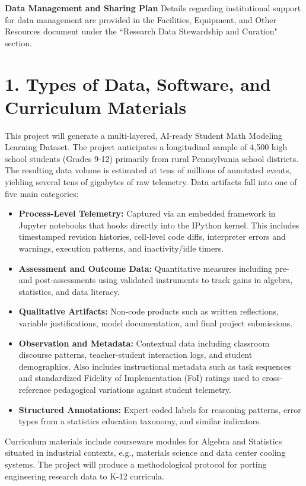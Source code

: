 \documentclass[11pt]{article}
\begin{document}
%

\noindent \textbf{Data Management and Sharing Plan} 
Details regarding institutional support for data management are provided in the Facilities, Equipment, and Other Resources document under the ``Research Data Stewardship and Curation" section.

\section*{1. Types of Data, Software, and Curriculum Materials}
This project will generate a multi-layered, AI-ready Student Math Modeling Learning Dataset.
The project anticipates a longitudinal sample of 4,500 high school students (Grades 9-12) primarily from rural Pennsylvania school districts.
The resulting data volume is estimated at tens of millions of annotated events, yielding several tens of gigabytes of raw telemetry. 
Data artifacts fall into one of five main categories:
\vspace{-0.15cm}
\begin{itemize}
    \item \textbf{Process-Level Telemetry:} Captured via an embedded framework in Jupyter notebooks that hooks directly into the IPython kernel. This includes timestamped revision histories, cell-level code diffs, interpreter errors and warnings, execution patterns, and inactivity/idle timers.\vspace{-0.3cm}
    \item \textbf{Assessment and Outcome Data:} Quantitative measures including pre- and post-assessments using validated instruments to track gains in algebra, statistics, and data literacy. \vspace{-0.3cm}
    \item \textbf{Qualitative Artifacts:} Non-code products such as written reflections, variable justifications, model documentation, and final project submissions.\vspace{-0.3cm}
    \item \textbf{Observation and Metadata:} Contextual data including classroom discourse patterns, teacher-student interaction logs, and student demographics. Also includes instructional metadata such as task sequences and standardized Fidelity of Implementation (FoI) ratings used to cross-reference pedagogical variations against student telemetry.\vspace{-0.3cm}
    \item \textbf{Structured Annotations:} Expert-coded labels for reasoning patterns, error types from a statistics education taxonomy, and similar indicators.
\end{itemize}
\vspace{-0.15cm}
Curriculum materials include courseware modules for Algebra and Statistics situated in industrial contexts, e.g., materials science and data center cooling systems.
The project will produce a methodological protocol for porting engineering research data to K-12 curricula.
\end{document}
